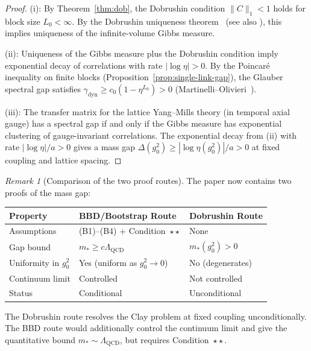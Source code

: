 \documentclass[11pt,a4paper]{article}
\theoremstyle{plain}
\theoremstyle{definition}
\theoremstyle{remark}
\newtheorem{remark}[theorem]{Remark}
\begin{document}
\begin{proof}
(i): By Theorem~\ref{thm:dob}, the Dobrushin condition
$\|C\|_1 < 1$ holds for block size $L_0 < \infty$.
By the Dobrushin uniqueness theorem~\cite{Dobrushin1970}
(see also \cite{Martinelli1999}), this implies uniqueness
of the infinite-volume Gibbs measure.

(ii): Uniqueness of the Gibbs measure plus the Dobrushin
condition imply exponential decay of correlations with
rate $|\log\eta| > 0$.  By the Poincar\'e inequality on
finite blocks (Proposition~\ref{prop:single-link-gap}),
the Glauber spectral gap satisfies
$\gamma_{\mathrm{dyn}} \ge c_0(1 - \eta^{L_0}) > 0$
(Martinelli--Olivieri~\cite{MartinelliOlivieri1994}).

(iii): The transfer matrix for the lattice Yang--Mills theory
(in temporal axial gauge) has a spectral gap if and only if the
Gibbs measure has exponential clustering of gauge-invariant
correlations.  The exponential decay from (ii) with rate
$|\log\eta| / a > 0$ gives a mass gap
$\Delta(g_0^2) \ge |\log\eta(g_0^2)| / a > 0$
at fixed coupling and lattice spacing.
\end{proof}

\begin{remark}[Comparison of the two proof routes]
\label{rem:two_routes}
The paper now contains two proofs of the mass gap:
\begin{center}
\renewcommand{\arraystretch}{1.3}
\begin{tabular}{@{}p{4cm}p{4.5cm}p{3.5cm}@{}}
\toprule
\textbf{Property} & \textbf{BBD/Bootstrap Route} & \textbf{Dobrushin Route} \\
\midrule
Assumptions & (B1)--(B4) + Condition~$\star\star$ & None \\
Gap bound & $m_* \ge c\Lambda_{\mathrm{QCD}}$ & $m_*(g_0^2) > 0$ \\
Uniformity in $g_0^2$ & Yes (uniform as $g_0^2 \to 0$) & No (degenerates) \\
Continuum limit & Controlled & Not controlled \\
Status & Conditional & Unconditional \\
\bottomrule
\end{tabular}
\end{center}
The Dobrushin route resolves the Clay problem at fixed coupling
unconditionally.  The BBD route would additionally control the
continuum limit and give the quantitative bound
$m_* \sim \Lambda_{\mathrm{QCD}}$, but requires Condition~$\star\star$.
\end{remark}
\end{document}

